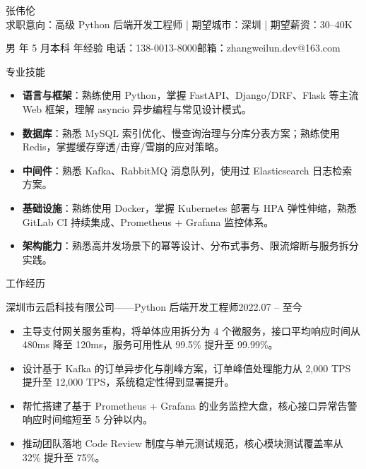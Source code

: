 \documentclass[10.5pt,fontset=windows]{ctexart}
\newcommand{\rsection}[1]{%
  \vspace{9pt}%
  {\color{maincolor}\heiti\zihao{4}#1}\par
  \vspace{1pt}{\color{maincolor}\rule{\textwidth}{1pt}}\par
  \vspace{3pt}}
\newcommand{\entryhead}[2]{%
  {\heiti #1}\hfill{\color{graytext}\small #2}\par\vspace{1pt}}
\begin{document}
\begin{center}
  {\heiti 张伟伦}\\[4pt]
  {求职意向：高级 Python 后端开发工程师}\quad
  {\color{graytext}|}\quad
  {期望城市：深圳}\quad
  {\color{graytext}|}\quad
  {期望薪资：30--40K}
\end{center}
\vspace{2pt}
\begin{center}
  男 年 5 月\quad 本科 年经验\quad
  电话：138-0013-8000\quad 邮箱：zhangweilun.dev@163.com
\end{center}

\rsection{专业技能}
\begin{itemize}
  \item \textbf{语言与框架}：熟练使用 Python，掌握 FastAPI、Django/DRF、Flask 等主流 Web 框架，理解 asyncio 异步编程与常见设计模式。
  \item \textbf{数据库}：熟悉 MySQL 索引优化、慢查询治理与分库分表方案；熟练使用 Redis，掌握缓存穿透/击穿/雪崩的应对策略。
  \item \textbf{中间件}：熟悉 Kafka、RabbitMQ 消息队列，使用过 Elasticsearch 日志检索方案。
  \item \textbf{基础设施}：熟练使用 Docker，掌握 Kubernetes 部署与 HPA 弹性伸缩，熟悉 GitLab CI 持续集成、Prometheus + Grafana 监控体系。
  \item \textbf{架构能力}：熟悉高并发场景下的幂等设计、分布式事务、限流熔断与服务拆分实践。
\end{itemize}

\rsection{工作经历}

\entryhead{深圳市云启科技有限公司\quad ——\quad Python 后端开发工程师}{2022.07 -- 至今}
\begin{itemize}
  \item 主导支付网关服务重构，将单体应用拆分为 4 个微服务，接口平均响应时间从 480ms 降至 120ms，服务可用性从 99.5\% 提升至 99.99\%。
  \item 设计基于 Kafka 的订单异步化与削峰方案，订单峰值处理能力从 2,000 TPS 提升至 12,000 TPS，系统稳定性得到显署提升。
  \item 帮忙搭建了基于 Prometheus + Grafana 的业务监控大盘，核心接口异常告警响应时间缩短至 5 分钟以内。
  \item 推动团队落地 Code Review 制度与单元测试规范，核心模块测试覆盖率从 32\% 提升至 75\%。
\end{itemize}
\end{document}
